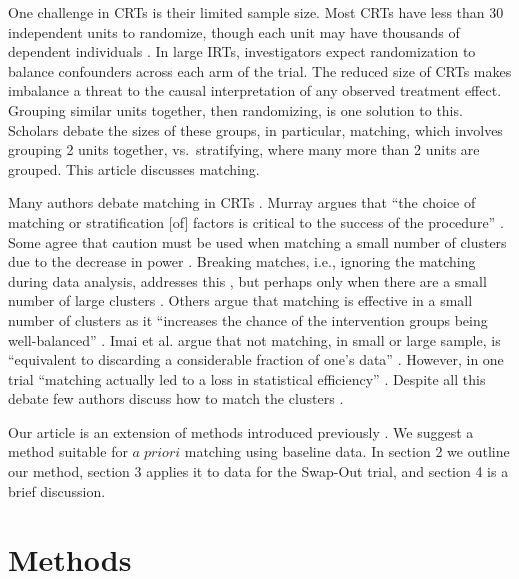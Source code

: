 \documentclass[]{article}
\begin{document}
One challenge in CRTs is their limited sample size. Most CRTs have less
than 30 independent units to randomize, though each unit may have
thousands of dependent individuals \citep{balzer2012match}. In large
IRTs, investigators expect randomization to balance confounders across
each arm of the trial. The reduced size of CRTs makes imbalance a threat
to the causal interpretation of any observed treatment effect. Grouping
similar units together, then randomizing, is one solution to this.
Scholars debate the sizes of these groups, in particular, matching,
which involves grouping 2 units together, vs.~stratifying, where many
more than 2 units are grouped\citep{PMVsStrat}. This article discusses
matching.

Many authors debate matching in CRTs
\citep{balzer2012match, CRTrials2009, gatsonis2017methods, diehr1995breaking, murray1998design, imai2009essential, PMVsStrat, donner2007merits, klar1997merits, donner2000design, martin1993effect}.
Murray argues that ``the choice of matching or stratification {[}of{]}
factors is critical to the success of the procedure''
\citep{murray1998design}. Some agree that caution must be used when
matching a small number of clusters due to the decrease in power
\citep{donner2000design, klar1997merits, balzer2012match, martin1993effect}.
Breaking matches, i.e., ignoring the matching during data analysis,
addresses this \citep{diehr1995breaking}, but perhaps only when there
are a small number of large clusters \citep{donner2007merits}. Others
argue that matching is effective in a small number of clusters as it
``increases the chance of the intervention groups being well-balanced''
\citep{donner2007merits}. Imai et al. argue that not matching, in small
or large sample, is ``equivalent to discarding a considerable fraction
of one's data'' \citep{imai2009essential}. However, in one trial
``matching actually led to a loss in statistical efficiency''
\citep[\citet{donner2000design}]{manun1994influence}. Despite all this
debate few authors discuss how to match the clusters
\citep{raab2001balance}.

Our article is an extension of methods introduced previously
\citep{gatsonis2017methods}. We suggest a method suitable for
\(a \; priori\) matching using baseline data. In section 2 we outline
our method, section 3 applies it to data for the Swap-Out trial, and
section 4 is a brief discussion.

\section{Methods }\label{methods}
\end{document}
